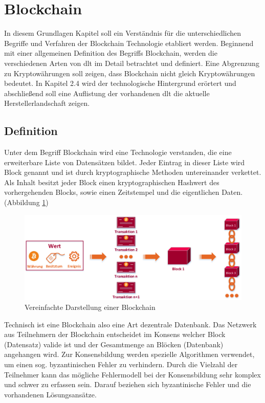 \section{Blockchain}
In diesem Grundlagen Kapitel soll ein Verständnis für die unterschiedlichen Begriffe und Verfahren der Blockchain Technologie etabliert werden. Beginnend mit einer allgemeinen Definition des Begriffs Blockchain, werden die verschiedenen Arten von \ac{dlt} im Detail betrachtet und definiert. Eine Abgrenzung zu Kryptowährungen soll zeigen, dass Blockchain nicht gleich Kryptowährungen bedeutet. In Kapitel 2.4 wird der technologische Hintergrund erörtert und abschließend soll eine Auflistung der vorhandenen \ac{dlt} die aktuelle Herstellerlandschaft zeigen.

\subsection{Definition}
Unter dem Begriff Blockchain wird eine Technologie verstanden, die eine erweiterbare Liste von Datensätzen bildet. Jeder Eintrag in dieser Liste wird Block genannt und ist durch kryptographische Methoden untereinander verkettet. Als Inhalt besitzt jeder Block einen kryptographischen Hashwert des vorhergehenden Blocks, sowie einen Zeitstempel und die eigentlichen Daten.\cite[Vgl.]{narayanan2016bitcoin} (Abbildung \ref{fig:simple-blockchain-schema})
\begin{figure}[h!]
	\centering
	\includegraphics[width=1.0\linewidth]{pictures/simple-blockchain-schema}
	\caption[Vereinfachte Darstellung einer Blockchain]{Vereinfachte Darstellung einer Blockchain\cite{Gayvoronskaya2017}}
	\label{fig:simple-blockchain-schema}
\end{figure}

Technisch ist eine Blockchain also eine Art dezentrale Datenbank. Das Netzwerk aus Teilnehmern der Blockchain entscheidet im Konsens welcher Block (Datensatz) valide ist und der Gesamtmenge an Blöcken (Datenbank) angehangen wird. Zur Konsensbildung werden spezielle Algorithmen verwendet, um einen sog. byzantinischen Fehler zu verhindern. Durch die Vielzahl der Teilnehmer kann das mögliche Fehlermodell bei der Konsensbildung sehr komplex und schwer zu erfassen sein. Darauf beziehen sich byzantinische Fehler und die vorhandenen Lösungsansätze.

